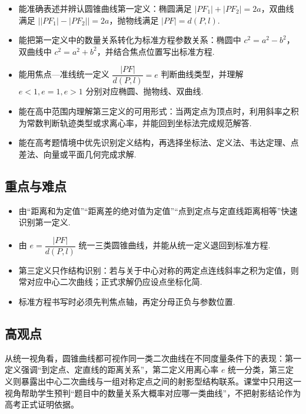 \documentclass[UTF8,a4paper,11pt]{ctexart}
\begin{document}
\begin{itemize}

\item 能准确表述并辨认圆锥曲线第一定义：椭圆满足 $|PF_1|+|PF_2|=2a$，双曲线满足 $\bigl||PF_1|-|PF_2|\bigr|=2a$，抛物线满足 $|PF|=d(P,l)$.

\item 能把第一定义中的数量关系转化为标准方程参数关系：椭圆中 $c^2=a^2-b^2$，双曲线中 $c^2=a^2+b^2$，并结合焦点位置写出标准方程.

\item 能用焦点—准线统一定义 $\dfrac{|PF|}{d(P,l)}=e$ 判断曲线类型，并理解 $e<1,e=1,e>1$ 分别对应椭圆、抛物线、双曲线.

\item 能在高中范围内理解第三定义的可用形式：当两定点为顶点时，利用斜率之积为常数判断轨迹类型或求离心率，并能回到坐标法完成规范解答.

\item 能在高考题情境中优先识别定义结构，再选择坐标法、定义法、韦达定理、点差法、向量或平面几何完成求解.

\end{itemize}

\subsection*{重点与难点}

\begin{itemize}

\item 由“距离和为定值”“距离差的绝对值为定值”“点到定点与定直线距离相等”快速识别第一定义.

\item 由 $e=\dfrac{|PF|}{d(P,l)}$ 统一三类圆锥曲线，并能从统一定义退回到标准方程.

\item 第三定义只作结构识别：若与关于中心对称的两定点连线斜率之积为定值，则常对应中心二次曲线；正式求解仍应设点坐标化简.

\item 标准方程书写时必须先判焦点轴，再定分母正负与参数位置.

\end{itemize}

\subsection*{高观点}

从统一视角看，圆锥曲线都可视作同一类二次曲线在不同度量条件下的表现：第一定义强调“到定点、定直线的距离关系”，第二定义用离心率 $e$ 统一分类，第三定义则暴露出中心二次曲线与一组对称定点之间的射影型结构联系。课堂中只用这一视角帮助学生预判“题目中的数量关系大概率对应哪一类曲线”，不把射影结论作为高考正式证明依据。
\end{document}
